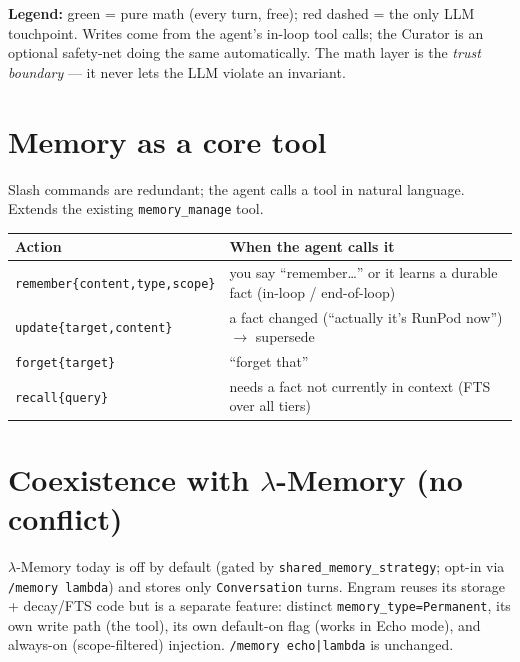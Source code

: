 \documentclass[11pt]{article}
\begin{document}
\textbf{Legend:} \textcolor{mathgreen}{green = pure math} (every turn, free); \textcolor{llmred}{red dashed = the only LLM touchpoint}. Writes come from the agent's in-loop tool calls; the Curator is an optional safety-net doing the same automatically. The math layer is the \emph{trust boundary} — it never lets the LLM violate an invariant.

\section{Memory as a core tool}
Slash commands are redundant; the agent calls a tool in natural language. Extends the existing \texttt{memory\_manage} tool.
\begin{center}\small
\begin{tabular}{@{}p{4.4cm}p{10.2cm}@{}}
\toprule
\textbf{Action} & \textbf{When the agent calls it}\\
\midrule
\texttt{remember\{content,type,scope\}} & you say ``remember\dots'' or it learns a durable fact (in-loop / end-of-loop)\\
\texttt{update\{target,content\}} & a fact changed (``actually it's RunPod now'') $\to$ supersede\\
\texttt{forget\{target\}} & ``forget that''\\
\texttt{recall\{query\}} & needs a fact not currently in context (FTS over all tiers)\\
\bottomrule
\end{tabular}
\end{center}

\section{Coexistence with $\lambda$-Memory (no conflict)}
$\lambda$-Memory today is off by default (gated by \texttt{shared\_memory\_strategy}; opt-in via \texttt{/memory lambda}) and stores only \texttt{Conversation} turns. Engram reuses its storage + decay/FTS code but is a separate feature: distinct \texttt{memory\_type=Permanent}, its own write path (the tool), its own default-on flag (works in Echo mode), and always-on (scope-filtered) injection. \texttt{/memory echo|lambda} is unchanged.
\end{document}
